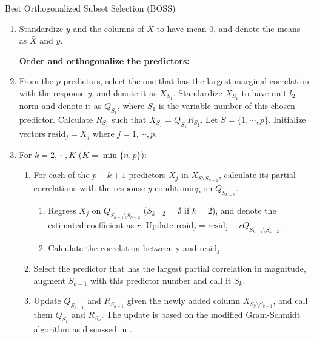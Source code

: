 \begin{algorithm}
	\caption{Best Orthogonalized Subset Selection (BOSS)}\label{alg:boss}
	\begin{enumerate}[label=\arabic*.]
		\item Standardize $y$ and the columns of $X$ to have mean $0$, and denote the means as $\bar{X}$ and $\bar{y}$.

		\textbf{Order and orthogonalize the predictors:}

		\item From the $p$ predictors, select the one that has the largest marginal correlation with the response $y$,  and denote it as $X_{S_1}$. Standardize $X_{S_1}$ to have unit $l_2$ norm and denote it as $Q_{S_1}$, where $S_1$ is the variable number of this chosen predictor. Calculate $R_{S_1}$ such that $X_{S_1} = Q_{S_1} R_{S_1}$. Let $S=\{1,\cdots, p\}$. Initialize vectors $\text{resid}_j=X_j$ where $j=1,\cdots,p$.
		\item For $k=2,\cdots,K$ ($K=\min\{n,p\}$):
		\begin{enumerate}[label=\alph*.]
			\item For each of the $p-k+1$ predictors $X_j$ in $X_{S \setminus S_{k-1} }$, calculate its partial correlations with the response $y$ conditioning on $Q_{S_{k-1}}$. 

			\begin{enumerate}[label=a\arabic*.]
				\item Regress $X_j$ on $Q_{S_{k-1} \setminus S_{k-2}}$ ($S_{k-2}=\emptyset$ if $k=2$), and denote the estimated coefficient as $r$. Update $\text{resid}_j = \text{resid}_j - r Q_{S_{k-1} \setminus S_{k-2}}$.
				\item Calculate the correlation between y and $\text{resid}_j$.
			\end{enumerate}
			\item Select the predictor that has the largest partial correlation in magnitude, augment $S_{k-1}$ with this predictor number and call it $S_{k}$.
			\item Update $Q_{S_{k-1}}$ and $R_{S_{k-1}}$ given the newly added column $X_{S_k \setminus S_{k-1}}$, and call them $Q_{S_k}$ and $R_{S_k}$. The update is based on the modified Gram-Schmidt algorithm as discussed in \citet{hammarling2008updating}.
		\end{enumerate}
		

\end{enumerate}
\end{algorithm}
